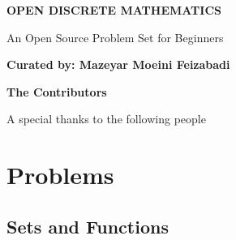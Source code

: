 \documentclass[addpoints]{exam}
\begin{document}
	
\begin{titlepage}
	\begin{center}
		\vspace*{1cm}
		
		\textbf{\Huge OPEN DISCRETE MATHEMATICS}
		
		\vspace{4cm}
		
		
		\vspace{0.5cm}
		{\LARGE An Open Source Problem Set for Beginners}
		
		\vspace{3cm}
		
		\textbf{Curated by: Mazeyar Moeini Feizabadi}
		
		
	\end{center}
\end{titlepage}	

\begin{titlepage}

	
		
	\vspace{4cm}
	
	\textbf{\huge The Contributors}
	
	\vspace{0.5cm}
	{\LARGE A special thanks to the following people}
	
	\vspace{1cm}
	
	\vspace{0.2cm}
	
	\vspace{0.2cm}
	
	\vspace{0.2cm}
	
	\vspace{0.2cm}
	
		
\end{titlepage}	
	
	
\section{\Huge Problems}
\subsection{\huge Sets and Functions}
\end{document}
